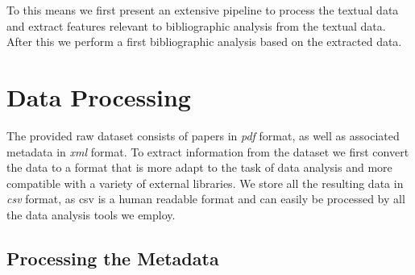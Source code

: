 \documentclass[journal,twocolumn]{IEEEtran}
\begin{document}
To this means we first present an extensive pipeline to process the
textual data and extract features relevant to bibliographic analysis
from the textual data. After this we perform a first bibliographic
analysis based on the extracted data.

    \hypertarget{data-processing}{%
\section{Data Processing}\label{data-processing}}

    The provided raw dataset consists of papers in \emph{pdf} format, as
well as associated metadata in \emph{xml} format. To extract information
from the dataset we first convert the data to a format that is more
adapt to the task of data analysis and more compatible with a variety of
external libraries. We store all the resulting data in \emph{csv}
format, as csv is a human readable format and can easily be processed by
all the data analysis tools we employ.

    \hypertarget{processing-the-metadata}{%
\subsection{Processing the Metadata}\label{processing-the-metadata}}
\end{document}
